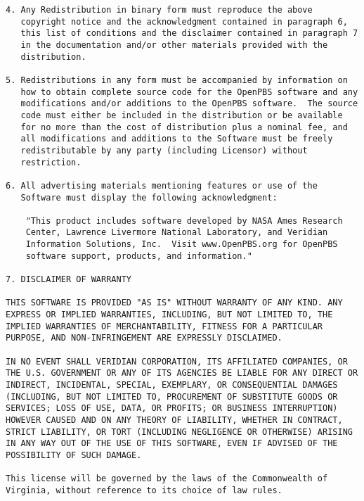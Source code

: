 \begin{verbatim}
4. Any Redistribution in binary form must reproduce the above
   copyright notice and the acknowledgment contained in paragraph 6,
   this list of conditions and the disclaimer contained in paragraph 7
   in the documentation and/or other materials provided with the
   distribution.

5. Redistributions in any form must be accompanied by information on
   how to obtain complete source code for the OpenPBS software and any
   modifications and/or additions to the OpenPBS software.  The source
   code must either be included in the distribution or be available
   for no more than the cost of distribution plus a nominal fee, and
   all modifications and additions to the Software must be freely
   redistributable by any party (including Licensor) without
   restriction.

6. All advertising materials mentioning features or use of the
   Software must display the following acknowledgment:

    "This product includes software developed by NASA Ames Research
    Center, Lawrence Livermore National Laboratory, and Veridian
    Information Solutions, Inc.  Visit www.OpenPBS.org for OpenPBS
    software support, products, and information."

7. DISCLAIMER OF WARRANTY

THIS SOFTWARE IS PROVIDED "AS IS" WITHOUT WARRANTY OF ANY KIND. ANY
EXPRESS OR IMPLIED WARRANTIES, INCLUDING, BUT NOT LIMITED TO, THE
IMPLIED WARRANTIES OF MERCHANTABILITY, FITNESS FOR A PARTICULAR
PURPOSE, AND NON-INFRINGEMENT ARE EXPRESSLY DISCLAIMED.

IN NO EVENT SHALL VERIDIAN CORPORATION, ITS AFFILIATED COMPANIES, OR
THE U.S. GOVERNMENT OR ANY OF ITS AGENCIES BE LIABLE FOR ANY DIRECT OR
INDIRECT, INCIDENTAL, SPECIAL, EXEMPLARY, OR CONSEQUENTIAL DAMAGES
(INCLUDING, BUT NOT LIMITED TO, PROCUREMENT OF SUBSTITUTE GOODS OR
SERVICES; LOSS OF USE, DATA, OR PROFITS; OR BUSINESS INTERRUPTION)
HOWEVER CAUSED AND ON ANY THEORY OF LIABILITY, WHETHER IN CONTRACT,
STRICT LIABILITY, OR TORT (INCLUDING NEGLIGENCE OR OTHERWISE) ARISING
IN ANY WAY OUT OF THE USE OF THIS SOFTWARE, EVEN IF ADVISED OF THE
POSSIBILITY OF SUCH DAMAGE.

This license will be governed by the laws of the Commonwealth of
Virginia, without reference to its choice of law rules.
\end{verbatim}
